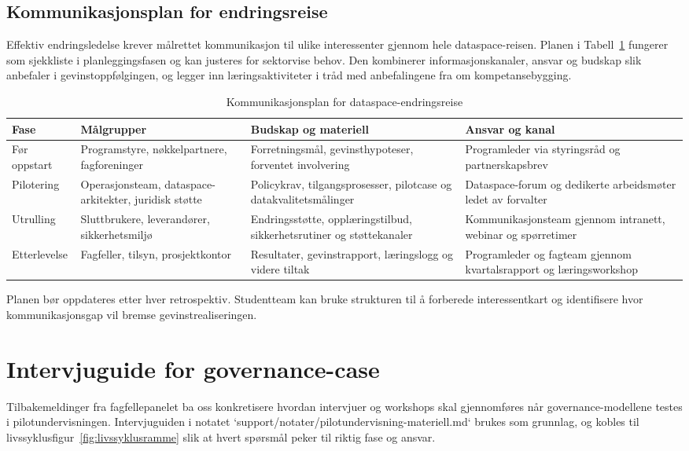 \subsection*{Kommunikasjonsplan for endringsreise}
Effektiv endringsledelse krever målrettet kommunikasjon til ulike interessenter gjennom hele dataspace-reisen. Planen i Tabell~\ref{tab:kommunikasjonsplan} fungerer som sjekkliste i planleggingsfasen og kan justeres for sektorvise behov. Den kombinerer informasjonskanaler, ansvar og budskap slik \citet{digdir2022gevinst} anbefaler i gevinstoppfølgingen, og legger inn læringsaktiviteter i tråd med anbefalingene fra \citet{dssc2023skills} om kompetansebygging.

\begin{table}[h]
    \centering
    \caption{Kommunikasjonsplan for dataspace-endringsreise}
    \label{tab:kommunikasjonsplan}
    \begin{tabular}{p{2.8cm}p{3.6cm}p{3.6cm}p{3.4cm}}
        \toprule
        Fase & Målgrupper & Budskap og materiell & Ansvar og kanal \\
        \midrule
        Før oppstart & Programstyre, nøkkelpartnere, fagforeninger & Forretningsmål, gevinsthypoteser, forventet involvering & Programleder via styringsråd og partnerskapsbrev \\
        Pilotering & Operasjonsteam, dataspace-arkitekter, juridisk støtte & Policykrav, tilgangsprosesser, pilotcase og datakvalitetsmålinger & Dataspace-forum og dedikerte arbeidsmøter ledet av forvalter \\
        Utrulling & Sluttbrukere, leverandører, sikkerhetsmiljø & Endringsstøtte, opplæringstilbud, sikkerhetsrutiner og støttekanaler & Kommunikasjonsteam gjennom intranett, webinar og spørretimer \\
        Etterlevelse & Fagfeller, tilsyn, prosjektkontor & Resultater, gevinstrapport, læringslogg og videre tiltak & Programleder og fagteam gjennom kvartalsrapport og læringsworkshop \\
        \bottomrule
    \end{tabular}
\end{table}

Planen bør oppdateres etter hver retrospektiv. Studentteam kan bruke strukturen til å forberede interessentkart og identifisere hvor kommunikasjonsgap vil bremse gevinstrealiseringen.

\section{Intervjuguide for governance-case}
Tilbakemeldinger fra fagfellepanelet ba oss konkretisere hvordan intervjuer og workshops skal gjennomføres når governance-modellene testes i pilotundervisningen. Intervjuguiden i notatet `support/notater/pilotundervisning-materiell.md` brukes som grunnlag, og kobles til livssyklusfigur~\ref{fig:livssyklusramme} slik at hvert spørsmål peker til riktig fase og ansvar.

